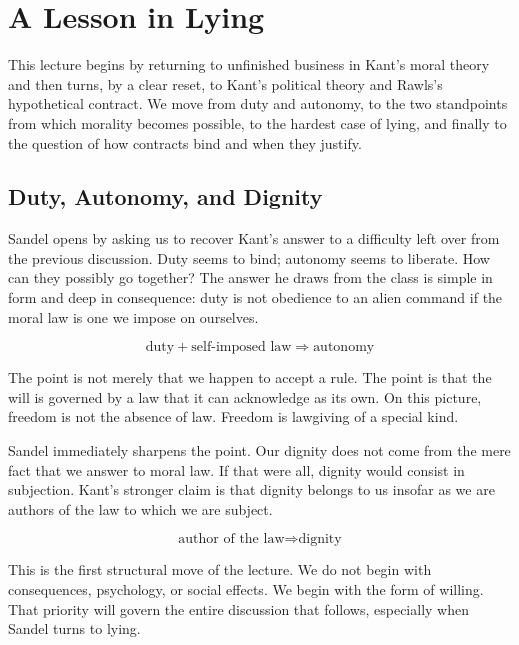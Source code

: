 \chapter{A Lesson in Lying}

This lecture begins by returning to unfinished business in Kant's moral theory and then turns, by a clear reset, to Kant's political theory and Rawls's hypothetical contract. We move from duty and autonomy, to the two standpoints from which morality becomes possible, to the hardest case of lying, and finally to the question of how contracts bind and when they justify.

\section{Duty, Autonomy, and Dignity}

Sandel opens by asking us to recover Kant's answer to a difficulty left over from the previous discussion. Duty seems to bind; autonomy seems to liberate. How can they possibly go together? The answer he draws from the class is simple in form and deep in consequence: duty is not obedience to an alien command if the moral law is one we impose on ourselves.

\begin{equation}
\text{duty} + \text{self-imposed law} \Longrightarrow \text{autonomy}
\end{equation}

The point is not merely that we happen to accept a rule. The point is that the will is governed by a law that it can acknowledge as its own. On this picture, freedom is not the absence of law. Freedom is lawgiving of a special kind.

Sandel immediately sharpens the point. Our dignity does not come from the mere fact that we answer to moral law. If that were all, dignity would consist in subjection. Kant's stronger claim is that dignity belongs to us insofar as we are authors of the law to which we are subject.

\begin{equation}
\text{author of the law} \Longrightarrow \text{dignity}
\end{equation}

This is the first structural move of the lecture. We do not begin with consequences, psychology, or social effects. We begin with the form of willing. That priority will govern the entire discussion that follows, especially when Sandel turns to lying.

